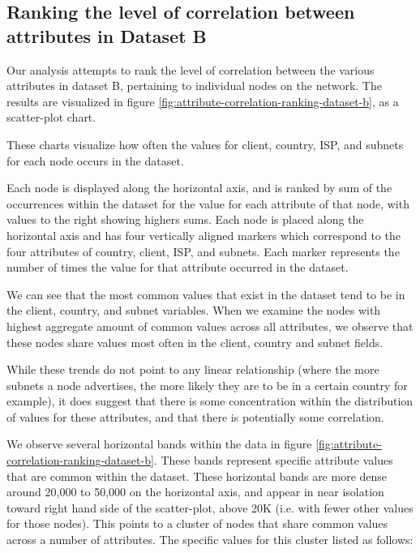 \documentclass[conference]{IEEEtran}
\begin{document}
\subsection{Ranking the level of correlation between attributes in Dataset B}

Our analysis attempts to rank the level of correlation between the various attributes in dataset B, pertaining to individual nodes on the network.  The results are visualized in figure \ref{fig:attribute-correlation-ranking-dataset-b}, as a scatter-plot chart.

These charts visualize how often the values for client, country, ISP, and subnets for each node occurs in the dataset.

Each node is displayed along the horizontal axis, and is ranked by sum of the occurrences within the dataset for the value for each attribute of that node, with values to the right showing highers sums.  Each node is placed along the horizontal axis and has four vertically aligned markers which correspond to the four attributes of country, client, ISP, and subnets.  Each marker represents the number of times the value for that attribute occurred in the dataset.

We can see that the most common values that exist in the dataset tend to be in the client, country, and subnet variables.  When we examine the nodes with highest aggregate amount of common values across all attributes, we observe that these nodes share values most often in the client, country and subnet fields.

While these trends do not point to any linear relationship (where the more subnets a node advertises, the more likely they are to be in a certain country for example), it does suggest that there is some concentration within the distribution of values for these attributes, and that there is potentially some correlation.


We observe several horizontal bands within the data in figure \ref{fig:attribute-correlation-ranking-dataset-b}.  These bands represent specific attribute values that are common within the dataset.  These horizontal bands are more dense around 20,000 to 50,000 on the horizontal axis, and appear in near isolation toward right hand side of the scatter-plot, above 20K (i.e. with fewer other values for those nodes).  This points to a cluster of nodes that share common values across a number of attributes.  The specific values for this cluster listed as follows:
\end{document}
